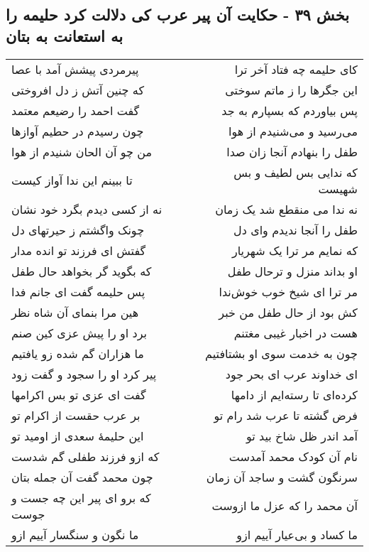 \begin{center}
\section*{بخش ۳۹ - حکایت آن پیر عرب کی دلالت کرد حلیمه را به استعانت به بتان}
\label{sec:sh039}
\begin{longtable}{l p{0.5cm} r}
پیرمردی پیشش آمد با عصا
&&
کای حلیمه چه فتاد آخر ترا
\\
که چنین آتش ز دل افروختی
&&
این جگرها را ز ماتم سوختی
\\
گفت احمد را رضیعم معتمد
&&
پس بیاوردم که بسپارم به جد
\\
چون رسیدم در حطیم آوازها
&&
می‌رسید و می‌شنیدم از هوا
\\
من چو آن الحان شنیدم از هوا
&&
طفل را بنهادم آنجا زان صدا
\\
تا ببینم این ندا آواز کیست
&&
که ندایی بس لطیف و بس شهیست
\\
نه از کسی دیدم بگرد خود نشان
&&
نه ندا می منقطع شد یک زمان
\\
چونک واگشتم ز حیرتهای دل
&&
طفل را آنجا ندیدم وای دل
\\
گفتش ای فرزند تو انده مدار
&&
که نمایم مر ترا یک شهریار
\\
که بگوید گر بخواهد حال طفل
&&
او بداند منزل و ترحال طفل
\\
پس حلیمه گفت ای جانم فدا
&&
مر ترا ای شیخ خوب خوش‌ندا
\\
هین مرا بنمای آن شاه نظر
&&
کش بود از حال طفل من خبر
\\
برد او را پیش عزی کین صنم
&&
هست در اخبار غیبی مغتنم
\\
ما هزاران گم شده زو یافتیم
&&
چون به خدمت سوی او بشتافتیم
\\
پیر کرد او را سجود و گفت زود
&&
ای خداوند عرب ای بحر جود
\\
گفت ای عزی تو بس اکرامها
&&
کرده‌ای تا رسته‌ایم از دامها
\\
بر عرب حقست از اکرام تو
&&
فرض گشته تا عرب شد رام تو
\\
این حلیمهٔ سعدی از اومید تو
&&
آمد اندر ظل شاخ بید تو
\\
که ازو فرزند طفلی گم شدست
&&
نام آن کودک محمد آمدست
\\
چون محمد گفت آن جمله بتان
&&
سرنگون گشت و ساجد آن زمان
\\
که برو ای پیر این چه جست و جوست
&&
آن محمد را که عزل ما ازوست
\\
ما نگون و سنگسار آییم ازو
&&
ما کساد و بی‌عیار آییم ازو
\\

\end{longtable}
\end{center}
